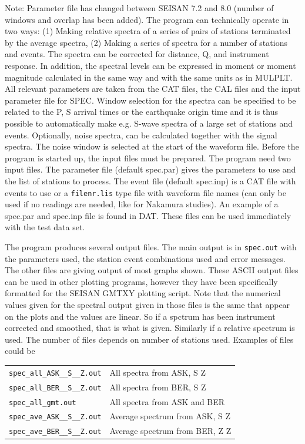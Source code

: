 Note: Parameter file has changed between SEISAN 7.2 and 8.0 (number of windows and overlap has been added). \newline
The program can technically operate in two ways: (1) Making relative spectra of a series of pairs of stations terminated by the average spectra, (2) Making a series of spectra for a number of stations and events. The spectra can be corrected for distance, Q, and instrument response. In addition, the spectral levels can be expressed in moment or moment magnitude calculated in the same way and with the same units as in MULPLT. All relevant parameters are taken from the CAT files, the CAL files and the input parameter file for SPEC. Window selection for the spectra can be specified to be related to the P, S arrival times or the earthquake origin time and it is thus possible to automatically make e.g. S-wave spectra of a large set of stations and events. Optionally, noise spectra, can be calculated together with the signal spectra. The noise window is selected at the start of the waveform file. \newline
Before the program is started up, the input files must be prepared. The program need two input files. The parameter file (default spec.par) gives the parameters to use and the list of stations to process. The event file (default spec.inp) is a CAT file with events to use or a \texttt{filenr.lis} type file with waveform file names (can only be used if no readings are needed, like for Nakamura studies). An example of a spec.par and spec.inp file is found in DAT. These files can be used immediately with the test data set. 

The program produces several output files. The main output is in \texttt{spec.out} with the parameters used, the station event combinations used and error messages. The other files are giving output of most graphs shown. These ASCII output files can be used in other plotting programs, however they have been specifically formatted for the SEISAN GMTXY plotting script. Note that the numerical values given for the spectral output given in those files is the same that appear on the plots and the values are linear. So if a spctrum has been instrument corrected and smoothed, that is what is given. Similarly if a relative spectrum is used.  The number of files depends on number of stations used. Examples of files could be 

\begin{tabular}{lp{10cm}}
\texttt{spec\_all\_ASK\_\_S\_\_Z.out} & All spectra from ASK, S  Z \\
\texttt{spec\_all\_BER\_\_S\_\_Z.out} & All spectra from BER, S  Z \\
\texttt{spec\_all\_gmt.out} &   All spectra from ASK and BER \\
\texttt{spec\_ave\_ASK\_\_S\_\_Z.out} & Average spectrum from ASK, S  Z \\
\texttt{spec\_ave\_BER\_\_S\_\_Z.out} & Average spectrum from BER, Z  Z\\
\end{tabular}

